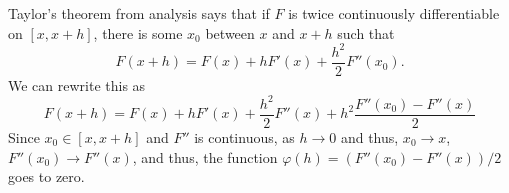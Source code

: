 \documentclass[12 pt, letterpaper]{hmcpset}
\begin{document}
\begin{solution}
	Taylor's theorem from analysis says that if $F$ is twice continuously differentiable on $[x, x + h]$, there is some $x_{0}$ between $x$ and $x + h$ such that
	\[
		F(x + h) = F(x) + h F'(x) + \frac{h^{2}}{2} F''(x_{0}).
	\]
	We can rewrite this as
	\[
		F(x + h) = F(x)	+ h F'(x) + \frac{h^{2}}{2} F''(x) + h^{2} \frac{F''(x_{0}) - F''(x)}{2}
	\]
	Since $x_{0} \in [x, x + h]$ and $F''$ is continuous, as $h \to 0$ and thus, $x_{0} \to x$, $F''(x_{0}) \to F''(x)$, and thus, the function $\varphi(h) = (F''(x_{0}) - F''(x)) / 2$ goes to zero.
\end{solution}
\end{document}
